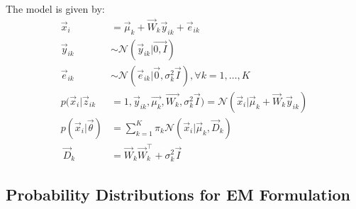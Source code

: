 \documentclass[12pt,twoside]{article}
\begin{document}
The model is given by:
\begin{align*}
	\vec{x}_i &= \vec{\mu}_k + \vec{W}_k\vec{y}_{ik} + \vec{e}_{ik}\\
	\vec{y}_{ik} &\sim \mathcal{N} (\vec{y}_{ik}\vert \vec{0,I})\\
	\vec{e}_{ik} & \sim \mathcal{N} (\vec{e}_{ik}\vert \vec{0},\sigma^2_k\vec{I}), \forall k = 1,\dots, K\\
	p(\vec{x}_i\vert  \vec{z}_{ik} &=1, \vec{y}_{ik}, \vec{\mu_k}, \vec{W_k}, \sigma^2_k \vec{I}) = \mathcal{N}(\vec{x}_i \vert \vec{\mu}_k + \vec{W}_k\vec{y}_{ik})\\
	p(\vec{x}_i\vert \vec{\theta})& = \sum_{k=1}^K \pi_k \mathcal{N}(\vec{x}_i \vert \vec{\mu}_k, \vec{D}_k)\\\
	\vec{D}_k &= \vec{W}_k\vec{W}_k^\top + \sigma_k^2\vec{I}
\end{align*}


\subsection{Probability Distributions for EM Formulation}
\end{document}
